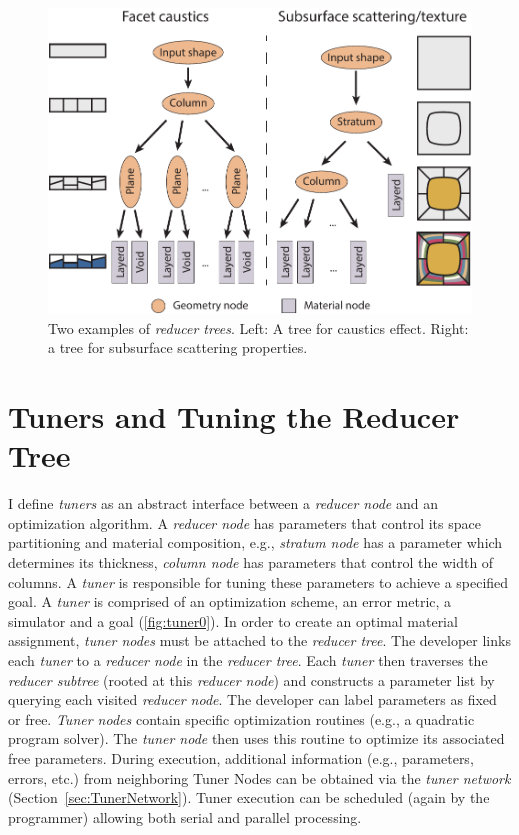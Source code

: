\begin{figure}[h]
\centering
\includegraphics[width=0.7\linewidth]{figure/redNetworkNew.pdf}
\caption{Two examples of \emph{reducer trees}. Left: A tree for caustics effect.
Right: a tree for subsurface scattering properties.
}
\label{fig:red1}
\end{figure}

\section{Tuners and Tuning the Reducer Tree}
I define \emph{tuners} as an abstract interface between a \emph{reducer node} and an optimization algorithm. 
A \emph{reducer node} has parameters that control its space partitioning and material composition,
e.g., \emph{stratum node} has a parameter which determines its thickness,
\emph{column node} has parameters that control the width of columns.
A \emph{tuner} is responsible for tuning these parameters to achieve a specified goal.
A \emph{tuner} is comprised of an optimization scheme, an error metric, a simulator and a goal (\autoref{fig:tuner0}). 
In order to create an optimal material assignment, \emph{tuner nodes} must be attached to the \emph{reducer tree}.
The developer links each \emph{tuner} to a \emph{reducer node} in the \emph{reducer tree}.
Each \emph{tuner} then traverses the \emph{reducer subtree} (rooted at this \emph{reducer node})
and constructs a parameter list by querying each visited \emph{reducer node}.
The developer can label parameters as fixed or free. \emph{Tuner nodes} contain specific optimization routines
(e.g., a quadratic program solver).
The \emph{tuner node} then uses this routine to optimize its associated free parameters.
During execution, additional information (e.g., parameters, errors, etc.) from neighboring Tuner Nodes
can be obtained via the \emph{tuner network} (Section~\ref{sec:TunerNetwork}).
Tuner execution can be scheduled (again by the programmer) allowing both serial and parallel processing.

